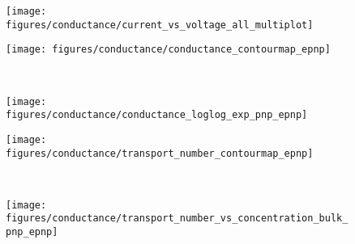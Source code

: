 \documentclass[journal=ancac3,manuscript=article,etalmode=truncate,maxauthors=0,layout=onecolumn]{achemso}
\begin{document}
\begin{figure*}[!p]
  \centering
  \begin{minipage}[l]{16cm}
    \begin{minipage}[t]{5cm}
      \begin{subfigure}[t]{4.5cm}
        \centering
        \caption{}\vspace{-3mm}\label{fig:current-voltage_curves}
        \texttt{[image: figures/conductance/current\_vs\_voltage\_all\_multiplot]}
      \end{subfigure}
    \end{minipage}
    \begin{minipage}[t]{5cm}
      \begin{subfigure}[t]{5cm}
        \centering
        \caption{}\vspace{0mm}\label{fig:conductance_contourmap_epnp}
        \texttt{[image: figures/conductance/conductance\_contourmap\_epnp]}
      \end{subfigure}
      \\
      \begin{subfigure}[t]{5cm}
        \centering
        \caption{}\vspace{0mm}\label{fig:conductance_loglog_exp_pnp_epnp}
        \texttt{[image: figures/conductance/conductance\_loglog\_exp\_pnp\_epnp]}
      \end{subfigure}
    \end{minipage}
    \begin{minipage}[t]{5cm}
      \begin{subfigure}[t]{5cm}
        \centering
        \caption{}\vspace{0mm}\label{fig:transport_number_contourmap_epnp}
        \texttt{[image: figures/conductance/transport\_number\_contourmap\_epnp]}
      \end{subfigure}
      \\
      \begin{subfigure}[t]{5cm}
        \centering
        \caption{}\vspace{0mm}\label{fig:transport_number_vs_concentration_bulk_pnp_epnp}
        \texttt{[image: figures/conductance/transport\_number\_vs\_concentration\_bulk\_pnp\_epnp]}
      \end{subfigure}
    \end{minipage}
  \end{minipage}


\end{figure*}
\end{document}
